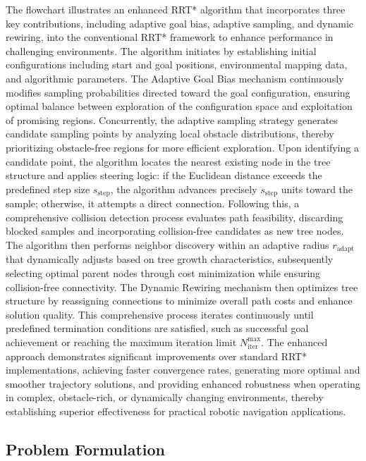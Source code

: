 \documentclass[pdflatex,sn-mathphys-num]{sn-jnl}
\theoremstyle{thmstyleone}%
\theoremstyle{thmstyletwo}%
\theoremstyle{thmstylethree}%
\begin{document}
The flowchart illustrates an enhanced RRT* algorithm that incorporates three key contributions, including adaptive goal bias, adaptive sampling, and dynamic rewiring, into the conventional RRT* framework to enhance performance in challenging environments. The algorithm initiates by establishing initial configurations including start and goal positions, environmental mapping data, and algorithmic parameters. The Adaptive Goal Bias mechanism continuously modifies sampling probabilities directed toward the goal configuration, ensuring optimal balance between exploration of the configuration space and exploitation of promising regions. Concurrently, the adaptive sampling strategy generates candidate sampling points by analyzing local obstacle distributions, thereby prioritizing obstacle-free regions for more efficient exploration. Upon identifying a candidate point, the algorithm locates the nearest existing node in the tree structure and applies steering logic: if the Euclidean distance exceeds the predefined step size $s_{\mathrm{step}}$, the algorithm advances precisely $s_{\mathrm{step}}$ units toward the sample; otherwise, it attempts a direct connection. Following this, a comprehensive collision detection process evaluates path feasibility, discarding blocked samples and incorporating collision-free candidates as new tree nodes. The algorithm then performs neighbor discovery within an adaptive radius $r_{\mathrm{adapt}}$ that dynamically adjusts based on tree growth characteristics, subsequently selecting optimal parent nodes through cost minimization while ensuring collision-free connectivity. The Dynamic Rewiring mechanism then optimizes tree structure by reassigning connections to minimize overall path costs and enhance solution quality. This comprehensive process iterates continuously until predefined termination conditions are satisfied, such as successful goal achievement or reaching the maximum iteration limit $N_{\mathrm{iter}}^{\max}$. The enhanced approach demonstrates significant improvements over standard RRT* implementations, achieving faster convergence rates, generating more optimal and smoother trajectory solutions, and providing enhanced robustness when operating in complex, obstacle-rich, or dynamically changing environments, thereby establishing superior effectiveness for practical robotic navigation applications. 

\subsection{Problem Formulation}\label{subsec2}
\end{document}

